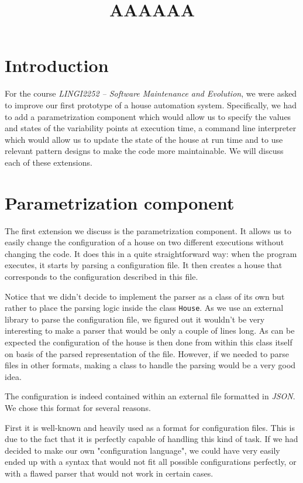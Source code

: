     \title{AAAAAA}
    \newpage

	\section{Introduction}
		For the course \textit{LINGI2252 -- Software Maintenance and Evolution}, we were asked to improve our first prototype of a house automation system. Specifically, we had to add a parametrization component which would allow us to specify the values and states of the variability points at execution time, a command line interpreter which would allow us to update the state of the house at run time and to use relevant pattern designs to make the code more maintainable. We will discuss each of these extensions.
		
	\section{Parametrization component}
		The first extension we discuss is the parametrization component.
		It allows us to easily change the configuration of a house on two different executions without changing the code.
		It does this in a quite straightforward way: when the program executes, it starts by parsing a configuration file. It then creates a house that corresponds to the configuration described in this file.
		
		Notice that we didn't decide to implement the parser as a class of its own but rather to place the parsing logic inside the class \texttt{House}. As we use an external library to parse the configuration file, we figured out it wouldn't be very interesting to make a parser that would be only a couple of lines long. As can be expected the configuration of the house is then done from within this class itself on basis of the parsed representation of the file. However, if we needed to parse files in other formats, making a class to handle the parsing would be a very good idea.
		
		The configuration is indeed contained within an external file formatted in \textit{JSON}.
		We chose this format for several reasons.
		
		First it is well-known and heavily used as a format for configuration files. This is due to the fact that it is perfectly capable of handling this kind of task. If we had decided to make our own "configuration language", we could have very easily ended up with a syntax that would not fit all possible configurations perfectly, or with a flawed parser that would not work in certain cases.

